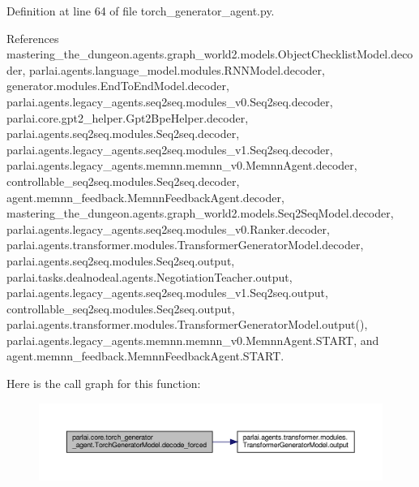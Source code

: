 Definition at line 64 of file torch\+\_\+generator\+\_\+agent.\+py.



References mastering\+\_\+the\+\_\+dungeon.\+agents.\+graph\+\_\+world2.\+models.\+Object\+Checklist\+Model.\+decoder, parlai.\+agents.\+language\+\_\+model.\+modules.\+R\+N\+N\+Model.\+decoder, generator.\+modules.\+End\+To\+End\+Model.\+decoder, parlai.\+agents.\+legacy\+\_\+agents.\+seq2seq.\+modules\+\_\+v0.\+Seq2seq.\+decoder, parlai.\+core.\+gpt2\+\_\+helper.\+Gpt2\+Bpe\+Helper.\+decoder, parlai.\+agents.\+seq2seq.\+modules.\+Seq2seq.\+decoder, parlai.\+agents.\+legacy\+\_\+agents.\+seq2seq.\+modules\+\_\+v1.\+Seq2seq.\+decoder, parlai.\+agents.\+legacy\+\_\+agents.\+memnn.\+memnn\+\_\+v0.\+Memnn\+Agent.\+decoder, controllable\+\_\+seq2seq.\+modules.\+Seq2seq.\+decoder, agent.\+memnn\+\_\+feedback.\+Memnn\+Feedback\+Agent.\+decoder, mastering\+\_\+the\+\_\+dungeon.\+agents.\+graph\+\_\+world2.\+models.\+Seq2\+Seq\+Model.\+decoder, parlai.\+agents.\+legacy\+\_\+agents.\+seq2seq.\+modules\+\_\+v0.\+Ranker.\+decoder, parlai.\+agents.\+transformer.\+modules.\+Transformer\+Generator\+Model.\+decoder, parlai.\+agents.\+seq2seq.\+modules.\+Seq2seq.\+output, parlai.\+tasks.\+dealnodeal.\+agents.\+Negotiation\+Teacher.\+output, parlai.\+agents.\+legacy\+\_\+agents.\+seq2seq.\+modules\+\_\+v1.\+Seq2seq.\+output, controllable\+\_\+seq2seq.\+modules.\+Seq2seq.\+output, parlai.\+agents.\+transformer.\+modules.\+Transformer\+Generator\+Model.\+output(), parlai.\+agents.\+legacy\+\_\+agents.\+memnn.\+memnn\+\_\+v0.\+Memnn\+Agent.\+S\+T\+A\+RT, and agent.\+memnn\+\_\+feedback.\+Memnn\+Feedback\+Agent.\+S\+T\+A\+RT.

Here is the call graph for this function\+:
\nopagebreak
\begin{figure}[H]
\begin{center}
\leavevmode
\includegraphics[width=350pt]{classparlai_1_1core_1_1torch__generator__agent_1_1TorchGeneratorModel_abfc801c11be6fc49dfbc4e70dc6b8ed9_cgraph}
\end{center}
\end{figure}
\mbox{\label{classparlai_1_1core_1_1torch__generator__agent_1_1TorchGeneratorModel_a5f1915200b6a8c6518fe17889d2b7cdc}} 
